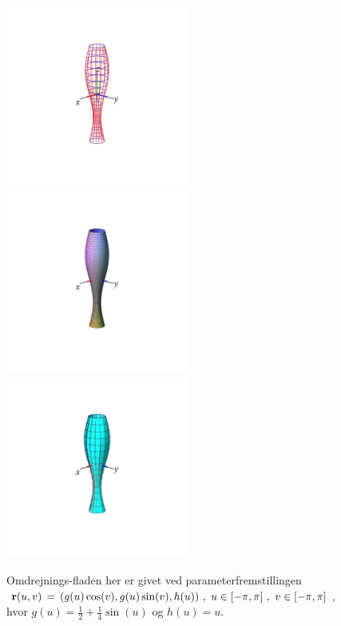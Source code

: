 \begin{figure}[h]
\centerline{\includegraphics[height=60mm]{FIGS/plotRevo1} \includegraphics[height=60mm]{FIGS/plotRevo2} \includegraphics[height=60mm]{FIGS/plotRevo3} }
\begin{center}
\caption{\small{Omdrejnings-fladen her er givet
ved parameterfremstillingen ${\bf r}(u, v) \, =
\, (g(u)\cos(v), g(u)\sin(v), h(u)) \,\,, \,\, u
\in [-\pi, \pi ]\,\, , \, \, v \in [-\pi, \pi]$,
hvor $g(u) = \frac{1}{2} + \frac{1}{4}\sin(u)$ og
$h(u) = u$.}} \label{figOmdrej12}
\end{center}
\end{figure}




